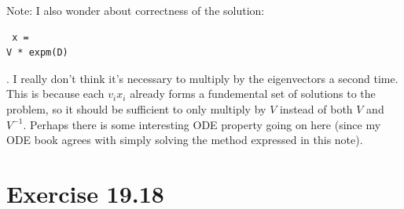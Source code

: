 \documentclass[11pt]{article}
\begin{document}
Note: I also wonder about correctness of the solution: \begin{verbatim} x = 
V * expm(D)\end{verbatim}. I really don't think it's necessary to multiply
by the eigenvectors a second time. This is because each $v_i x_i$ already forms
a fundemental set of solutions to the problem, so it should be sufficient
to only multiply by $V$ instead of both $V$ and $V^{-1}$. Perhaps there is 
some interesting ODE property going on here (since my ODE book agrees with
simply solving the method expressed in this note).

\section*{Exercise 19.18}

%
\end{document}
